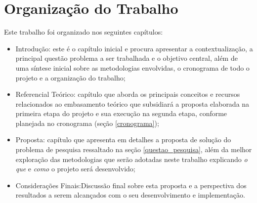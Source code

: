 \section{Organização do Trabalho}

Este trabalho foi organizado nos seguintes capítulos:

\begin{itemize}
    \item Introdução: este é o capítulo inicial e procura apresentar a contextualização, a principal questão problema a ser trabalhada e o objetivo central, além de uma síntese inicial sobre as metodologias envolvidas, o cronograma de todo o projeto e a organização do trabalho;
    \item Referencial Teórico: capítulo que aborda os principais conceitos e recursos relacionados ao embasamento teórico que subsidiará a proposta elaborada na primeira etapa do projeto e sua execução na segunda etapa, conforme planejada no cronograma (seção \ref{cronograma});
    \item Proposta: capítulo que apresenta em detalhes a proposta de solução do problema de pesquisa ressaltado na seção \ref{questao_pesquisa}, além da melhor exploração das metodologias que serão adotadas neste trabalho explicando \textit{o que} e \textit{como} o projeto será desenvolvido;
    \item Considerações Finais:Discussão final sobre esta proposta e a perspectiva dos resultados a serem alcançados com o seu desenvolvimento e implementação.
\end{itemize}